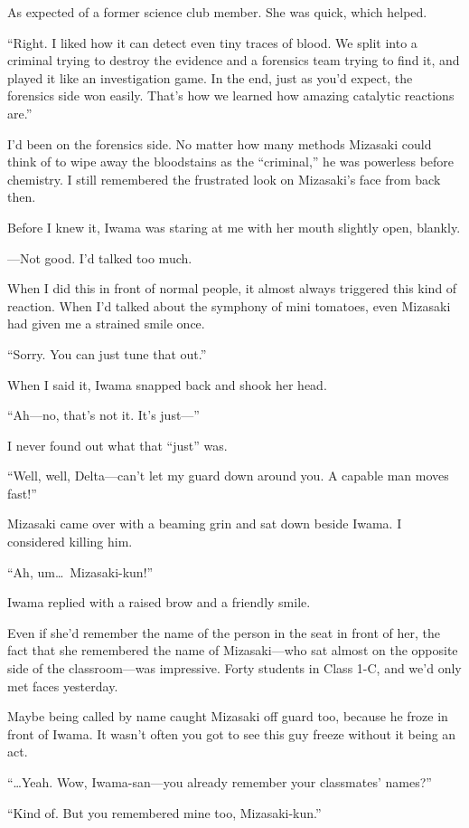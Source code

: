 \documentclass[
    a4paper,
    12pt,
    twoside,
    openany,
    UTF8,
    fontset=windows
]{ctexbook}
\begin{document}
As expected of a former science club member. She was quick, which helped.

``Right. I liked how it can detect even tiny traces of blood. We split into a criminal trying to destroy the evidence and a forensics team trying to find it, and played it like an investigation game. In the end, just as you'd expect, the forensics side won easily. That's how we learned how amazing catalytic reactions are.''

I'd been on the forensics side. No matter how many methods Mizasaki could think of to wipe away the bloodstains as the ``criminal,'' he was powerless before chemistry. I still remembered the frustrated look on Mizasaki's face from back then.

Before I knew it, Iwama was staring at me with her mouth slightly open, blankly.

---Not good. I'd talked too much.

When I did this in front of normal people, it almost always triggered this kind of reaction. When I'd talked about the symphony of mini tomatoes, even Mizasaki had given me a strained smile once.

``Sorry. You can just tune that out.''

When I said it, Iwama snapped back and shook her head.

``Ah---no, that's not it. It's just---''

I never found out what that ``just'' was.

``Well, well, Delta---can't let my guard down around you. A capable man moves fast!''

Mizasaki came over with a beaming grin and sat down beside Iwama. I considered killing him.

``Ah, um\dots\ Mizasaki-kun!''

Iwama replied with a raised brow and a friendly smile.

Even if she'd remember the name of the person in the seat in front of her, the fact that she remembered the name of Mizasaki---who sat almost on the opposite side of the classroom---was impressive. Forty students in Class 1-C, and we'd only met faces yesterday.

Maybe being called by name caught Mizasaki off guard too, because he froze in front of Iwama. It wasn't often you got to see this guy freeze without it being an act.

``\dots Yeah. Wow, Iwama-san---you already remember your classmates' names?''

``Kind of. But you remembered mine too, Mizasaki-kun.''
\end{document}
